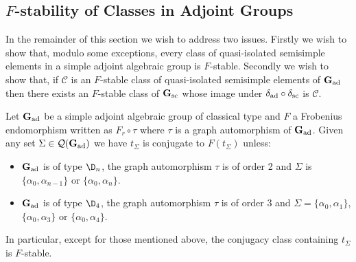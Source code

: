 \documentclass[eqthmnum]{jt-calcs}
\begin{document}
\subsection{\texorpdfstring{$F$-stability of Classes in Adjoint Groups}{Stability of Classes in Adjoint Groups}}
In the remainder of this section we wish to address two issues. Firstly we wish to show that, modulo some exceptions, every class of quasi-isolated semisimple elements in a simple adjoint algebraic group is $F$-stable. Secondly we wish to show that, if $\mathcal{C}$ is an $F$-stable class of quasi-isolated semisimple elements of $\mathbf{G}_{\operatorname{ad}}$ then there exists an $F$-stable class of $\mathbf{G}_{\operatorname{sc}}$ whose image under $\delta_{\operatorname{ad}}\circ\delta_{\operatorname{sc}}$ is $\mathcal{C}$.

\begin{prop}\label{prop:F-stable-classical-quasi-adjoint}
Let $\mathbf{G}_{\operatorname{ad}}$ be a simple adjoint algebraic group of classical type and $F$ a Frobenius endomorphism written as $F_r\circ\tau$ where $\tau$ is a graph automorphism of $\mathbf{G}_{\operatorname{ad}}$. Given any set $\Sigma \in \mathcal{Q}(\mathbf{G}_{\operatorname{ad}})$ we have $t_{\Sigma}$ is conjugate to $F(t_{\Sigma})$ unless:
\begin{itemize}
	\item $\mathbf{G}_{\operatorname{ad}}$ is of type $\D_n$, the graph automorphism $\tau$ is of order 2 and $\Sigma$ is $\{\alpha_0,\alpha_{n-1}\}$ or $\{\alpha_0,\alpha_n\}$.
	\item $\mathbf{G}_{\operatorname{ad}}$ is of type $\D_4$, the graph automorphism $\tau$ is of order 3 and $\Sigma = \{\alpha_0,\alpha_1\}$, $\{\alpha_0,\alpha_3\}$ or $\{\alpha_0,\alpha_4\}$.
\end{itemize}
In particular, except for those mentioned above, the conjugacy class containing $t_{\Sigma}$ is $F$-stable.
\end{prop}
\end{document}
